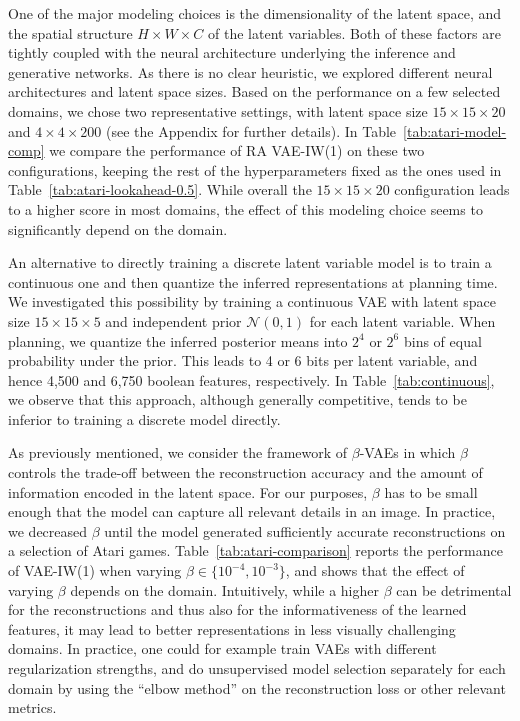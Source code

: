 One of the major modeling choices is the dimensionality of the latent space, and the spatial structure $H \times W \times C$ of the latent variables. Both of these factors are tightly coupled with the neural architecture underlying the inference and generative networks. As there is no clear heuristic, we explored different neural architectures and latent space sizes. Based on the performance on a few selected domains, we chose two representative settings, with latent space size $15 \times 15 \times 20$ and $4 \times 4 \times 200$ (see the Appendix for further details). In Table~\ref{tab:atari-model-comp} we compare the performance of RA VAE-IW(1) on these two configurations, keeping the rest of the hyperparameters fixed as the ones used in Table~\ref{tab:atari-lookahead-0.5}. While overall the $15 \times 15 \times 20$ configuration leads to a higher score in most domains, the effect of this modeling choice seems to significantly depend on the domain.

An alternative to directly training a discrete latent variable model is to train a continuous one and then quantize the inferred representations at planning time. We investigated this possibility by training a continuous VAE with latent space size $15 \times 15 \times 5$ and independent prior $\mathcal{N}(0, 1)$ for each latent variable. When planning, we quantize the inferred posterior means into $2^4$ or $2^6$ bins of equal probability under the prior. This leads to 4 or 6 bits per latent variable, and hence 4,500 and 6,750 boolean features, respectively. In Table~\ref{tab:continuous}, we observe that this approach, although generally competitive, tends to be inferior to training a discrete model directly.

As previously mentioned, we consider the framework of $\beta$-VAEs in which $\beta$ controls the trade-off between the reconstruction accuracy and the amount of information encoded in the latent space. For our purposes, $\beta$ has to be small enough that the model can capture all relevant details in an image. In practice, we decreased $\beta$ until the model generated sufficiently accurate reconstructions on a selection of Atari games. Table~\ref{tab:atari-comparison} reports the performance of VAE-IW(1) when varying $\beta \in \{10^{-4}, 10^{-3}\}$, and shows that the effect of varying $\beta$ depends on the domain. 
Intuitively, while a higher $\beta$ can be detrimental for the reconstructions and thus also for the informativeness of the learned features, it may lead to better representations in less visually challenging domains. In practice, one could for example train VAEs with different regularization strengths, and do unsupervised model selection separately for each domain by using the ``elbow method'' \cite{ketchen1996application} on the reconstruction loss or other relevant metrics.


